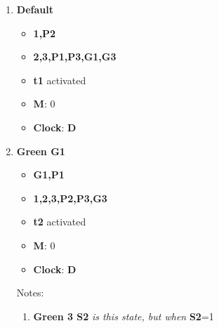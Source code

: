 \documentclass[letterpaper]{article}
\begin{document}
\begin{enumerate}
 \item \textbf{Default}
       \begin{itemize}
        \item {\color{green}\textbf{1,P2}}
        \item {\color{red}\textbf{2,3,P1,P3,G1,G3}}
        \item \textbf{t1} activated
        \item \textbf{M}: 0
        \item \textbf{Clock}: \textbf{D}
       \end{itemize}
 \item \textbf{Green G1}
       \begin{itemize}
        \item {\color{green}\textbf{G1,P1}}
        \item {\color{red}\textbf{1,2,3,P2,P3,G3}}
        \item \textbf{t2} activated
        \item \textbf{M}: 0
        \item \textbf{Clock}: \textbf{D}
       \end{itemize}
       Notes:
       \begin{enumerate}
        \item \textbf{Green 3 S2} \textit{is this state, but when} \textbf{S2}=1
       \end{enumerate}
       

\end{enumerate}
\end{document}
